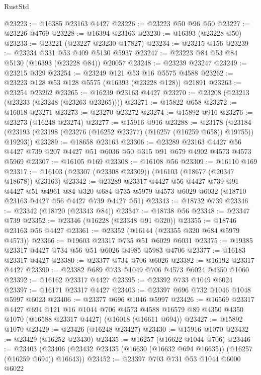 \begin{lexlean}{RustStd}
\begin{coremodule}
@23223 := @16385 @23163 @4427
@23226 := @23223 @50 @96 @50
@23227 := @23226 @4769
@23228 := @16394 @23163
@23230 := @16393 (@23228 @50)
@23233 := @23221 (@23227 @23230 @17827)
@23234 := @23215 @156
@23239 := @23234 @331 @53 @409 @5130 @5937
@23247 := @23223 @84 @53 @84 @5130 (@16393 (@23228 @84)) @20057
@23248 := @23239 @23247
@23249 := @23215 @329
@23254 := @23249 @121 @53 @16 @5575 @4588
@23262 := @23223 @128 @53 @128 @5575 (@16393 (@23228 @128)) @21891
@23263 := @23254 @23262
@23265 := @16239 @23163 @4427
@23270 := @23208 (@23213 (@23233 (@23248 (@23263 @23265))))
@23271 := @15822 @658
@23272 := @16018 @23271
@23273 := @23270 @23272
@23274 := @15892 @916
@23276 := @23273 (@16248 @23274)
@23277 := @15916 @916
@23288 := @23178
    (@23184 (@23193 (@23198 (@23276 (@16252 @23277) (@16257 (@16259 @658)) @19755)) @19293))
@23289 := @18658 @23163
@23306 := @23289
    @23163
    @4427
    @56
    @4427
    @739
    @207
    @4427
    @51
    @6036
    @50
    @315
    @91
    @679
    @4902
    @4573
    @4573
    @5969
@23307 := @16105 @169
@23308 := @16108 @56
@23309 := @16110 @169
@23317 := @16103 (@23307 (@23308 @23309)) (@16103 (@18677 (@20347 @18678)) @23163)
@23342 := @23289
    @23317
    @4427
    @56
    @4427
    @739
    @91
    @4427
    @51
    @4961
    @84
    @320
    @684
    @735
    @5979
    @4573
    @6029
    @6032
    (@18710 @23163 @4427 @56 @4427 @739 @4427 @51)
@23343 := @18732 @739
@23346 := @23342 (@18720 (@23343 @84))
@23347 := @18738 @56
@23348 := @23347 @739
@23352 := @23346 (@16228 (@23348 @91 @320))
@23355 := @18746 @23163 @56 @4427
@23361 := @23352 (@16144 (@23355 @320 @684 @5979 @4573))
@23366 := @19603 @23317 @735 @51 @6029 @6031
@23375 := @19385 @23317 @4427 @734 @56 @51 @6026 @4985 @5983 @4706
@23377 := @16183 @23317 @4427
@23380 := @23377 @734 @706 @6026
@23382 := @16192 @23317 @4427
@23390 := @23382 @689 @733 @1049 @706 @4573 @6024 @4350 @1060
@23392 := @16162 @23317 @4427
@23395 := @23392 @733 @1049 @6024
@23397 := @16171 @23317 @4427
@23403 := @23397 @696 @732 @1046 @1048 @5997 @6023
@23406 := @23377 @696 @1046 @5997
@23426 := @16569
    @23317
    @4427
    @694
    @121
    @16
    @1044
    @706
    @4573
    @4588
    @16579
    @89
    @4350
    @4350
    @1070
    (@16588 @23317 @4427)
    (@16018 (@16611 @694))
@23427 := @15892 @1070
@23429 := @23426 (@16248 @23427)
@23430 := @15916 @1070
@23432 := @23429 (@16252 @23430)
@23435 := @16257 (@16622 @1044 @706)
@23446 := @23403
    (@23406 (@23432 @23435 (@16630 (@16632 @694 @16635)) (@16257 (@16259 @694)) @16643))
@23452 := @23397 @703 @731 @53 @1044 @6000 @6022

\end{coremodule}
\end{lexlean}
